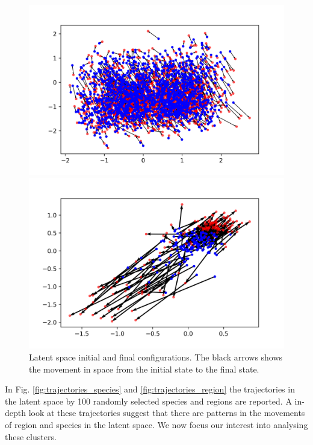 \documentclass[mscthesis]{usiinfthesis}
\begin{document}
\begin{figure}[ht] 
  \label{ fig7} 
  \begin{minipage}[b]{0.5\linewidth}
    \centering
    \includegraphics[width=\linewidth]{latentspace_species.png} 
    \vspace{4ex}
  \end{minipage}%
  \begin{minipage}[b]{0.5\linewidth}
    \centering
    \includegraphics[width=\linewidth]{latentspace_region.png} 
    \vspace{4ex}
  \end{minipage}  
\caption{Latent space initial and final configurations. The black arrows shows the movement in space from the initial state to the final state.}
\label{fig:latentspace_config}
\end{figure}

In Fig. \ref{fig:trajectories_species} and \ref{fig:trajectories_region} the trajectories in the latent space by 100 randomly selected species and regions are reported. A in-depth look at these trajectories suggest that there are patterns in the movements of region and species in the latent space. We now focus our interest into analysing these clusters. 
\end{document}

